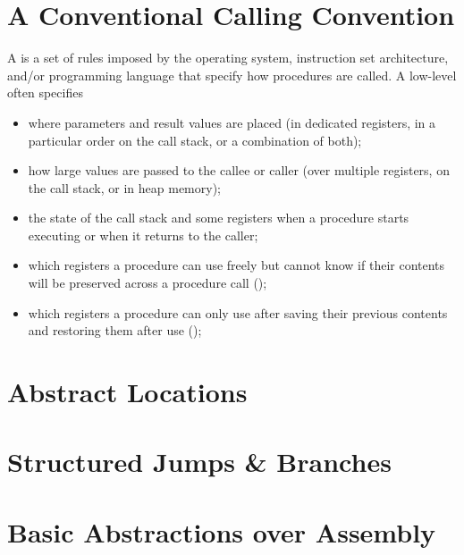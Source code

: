 \documentclass[main.tex]{subfiles}
\begin{document}
\section{A Conventional Calling Convention}
A  is a set of rules imposed by the operating system, instruction set architecture, and/or programming language that specify how procedures are called. A low-level  often specifies
\begin{itemize}[noitemsep]
	\item where parameters and result values are placed (in dedicated registers, in a particular order on the call stack, or a combination of both);
	\item how large values are passed to the callee or caller (over multiple registers, on the call stack, or in heap memory);
	\item the state of the call stack and some registers when a procedure starts executing or when it returns to the caller;
	\item which registers a procedure can use freely but cannot know if their contents will be preserved across a procedure call ();
	\item which registers a procedure can only use after saving their previous contents and restoring them after use ();
\end{itemize}


\section{Abstract Locations}

\section{Structured Jumps \& Branches}

\section{Basic Abstractions over Assembly}

\biblio{}
\onlyinsubfile{\glsaddall\printglossaries}
\end{document}
